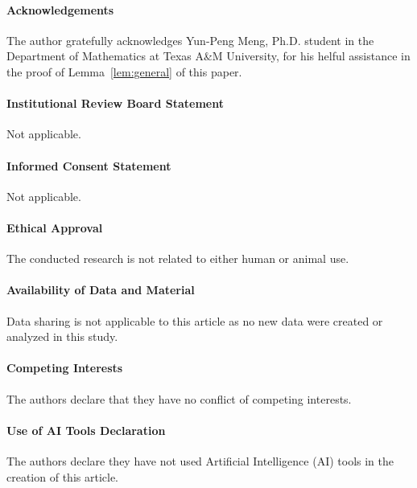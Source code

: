 \documentclass[reqno]{amsart}%
\theoremstyle{plain}
\theoremstyle{remark}
\begin{document}
\paragraph{\bf Acknowledgements}
The author gratefully acknowledges Yun-Peng Meng, Ph.D. student in the Department of Mathematics at Texas A\&M University, for his helful assistance in the proof of Lemma~\ref{lem:general} of this paper.

\paragraph{\bf Institutional Review Board Statement}
Not applicable. 

\paragraph{\bf Informed Consent Statement}
Not applicable. 

\paragraph{\bf Ethical Approval}
The conducted research is not related to either human or animal use. 

\paragraph{\bf Availability of Data and Material}
Data sharing is not applicable to this article as no new data were created or analyzed in this study. 

\paragraph{\bf Competing Interests}
The authors declare that they have no conflict of competing interests. 

\paragraph{\bf Use of AI Tools Declaration}
The authors declare they have not used Artificial Intelligence (AI) tools in the creation of this article. 
\end{document}
